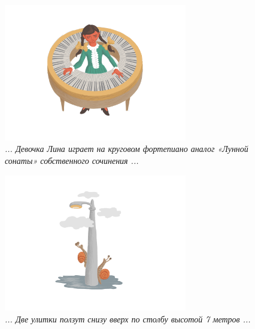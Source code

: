 \documentclass[10pt]{scrbook} \usepackage{modules/nonstahp_book}
\begin{document}
\begin{figure} \begin{center}
	\includegraphics[width=8cm]{figures/color/06}
	\caption{
             {\itshape ... Девочка Лина играет на круговом фортепиано аналог 
              «Лунной сонаты» собственного сочинения ...}\\
             }
\end{center} \end{figure}

\begin{figure} \begin{center}
	\includegraphics[width=8cm]{figures/color/07}
	\caption{
             {\itshape ... Две улитки ползут снизу вверх по столбу высотой 7 метров ...}\\
             }
\end{center} \end{figure}
\end{document}
